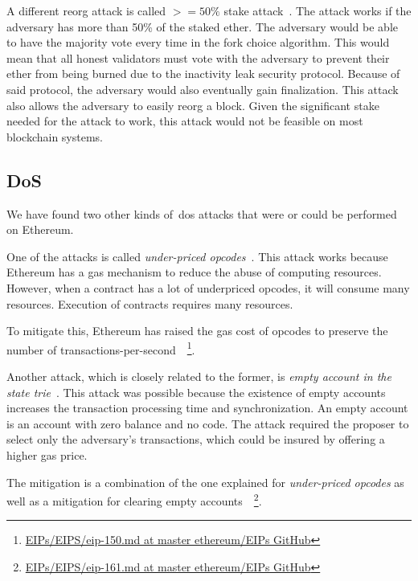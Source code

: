 A different reorg attack is called $>=50\%$ stake attack~\cite{EthereumAttackDefense2024}.
The attack works if the adversary has more than 50\% of the staked ether.
The adversary would be able to have the majority vote every time in the fork choice algorithm.
This would mean that all honest validators must vote with the adversary to prevent their ether from being burned due to the inactivity leak security protocol.
Because of said protocol, the adversary would also eventually gain finalization.
This attack also allows the adversary to easily reorg a block.
Given the significant stake needed for the attack to work, this attack would not be feasible on most blockchain systems.



\subsection{DoS}\label{subsec:dos}
We have found two other kinds of~\gls{dos} attacks that were or could be performed on Ethereum.

One of the attacks is called \textit{under-priced opcodes}~\cite{10.1145/3391195,9815256}.
This attack works because Ethereum has a gas mechanism to reduce the abuse of computing resources.
However, when a contract has a lot of underpriced opcodes, it will consume many resources.
Execution of contracts requires many resources.

To mitigate this,
Ethereum has raised the gas cost of opcodes
to preserve the number of transactions-per-second~\cite{Opcode-mitigation}~\footnote{
    \href{https://github.com/ethereum/EIPs/blob/master/EIPS/eip-150.md}{EIPs/EIPS/eip-150.md at master ethereum/EIPs GitHub}}.

Another attack, which is closely related to the former, is \textit{empty account in the state trie}~\cite{10.1145/3391195,9815256}.
This attack was possible because the existence of empty accounts increases the transaction processing time and synchronization.
An empty account is an account with zero balance and no code.
The attack required the proposer to select only the adversary's transactions, which could be insured by offering a higher gas price.

The mitigation is a combination of the one explained for \textit{under-priced opcodes} as well as a mitigation
for clearing empty accounts~\cite{Opcode-mitigation,empty-account-mitigation,empty-account-eip-mitigation}~\footnote{
    \href{https://github.com/ethereum/EIPs/blob/master/EIPS/eip-161.md}{EIPs/EIPS/eip-161.md at master ethereum/EIPs GitHub}}.


